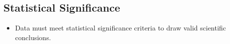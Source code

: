 \documentclass[12pt]{article}
\begin{document}
\subsection*{Statistical Significance}
\begin{itemize}
    \item Data must meet statistical significance criteria to draw valid scientific conclusions.
\end{itemize}
\end{document}
